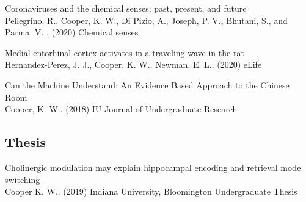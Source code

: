 \documentclass[10pt]{cooperCV2}
\begin{document}
\begin{etaremune}[resume,itemindent=-1.5\bibhang, topsep=0pt,
				   itemsep=\bibsep,partopsep=0pt,parsep=0pt,leftmargin={\bibhang+\widthof{[999]}}]
	
    \item Coronaviruses and the chemical senses: past, present, and future \\
     Pellegrino, R., Cooper, K. W., Di Pizio, A., Joseph, P. V., Bhutani, S., and Parma, V. . (2020) Chemical senses 
     
	
    \item Medial entorhinal cortex activates in a traveling wave in the rat \\
     Hernandez-Perez, J. J., Cooper, K. W., Newman, E. L.. (2020) eLife 
     
	
    \item Can the Machine Understand: An Evidence Based Approach to the Chinese Room \\
     Cooper, K. W.. (2018) IU Journal of Undergraduate Research 
     
	

\end{etaremune}

 

	

\subsection{Thesis} 
\begin{etaremune}[resume,itemindent=-1.5\bibhang, topsep=0pt,
				   itemsep=\bibsep,partopsep=0pt,parsep=0pt,leftmargin={\bibhang+\widthof{[999]}}] 
    
    \item Cholinergic modulation may explain hippocampal encoding and retrieval mode switching \\
     Cooper K. W.. (2019) Indiana University, Bloomington Undergraduate Thesis 
     
	

\end{etaremune}










%	









\end{document}
